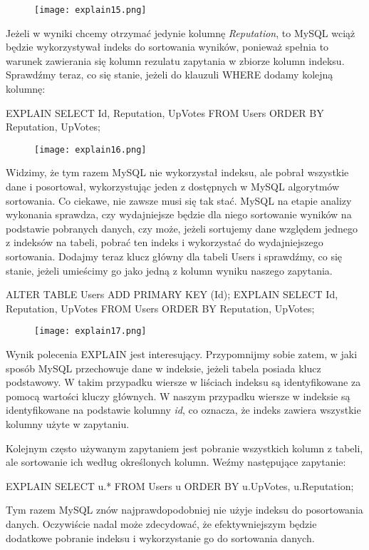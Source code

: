 \begin{figure}[H]
	\texttt{[image: explain15.png]} 
\end{figure}
Jeżeli w wyniki chcemy otrzymać jedynie kolumnę \textit{Reputation}, to MySQL wciąż będzie wykorzystywał indeks do sortowania wyników, ponieważ spełnia to warunek zawierania się kolumn rezulatu zapytania w zbiorze kolumn indeksu. Sprawdźmy teraz, co się stanie, jeżeli do klauzuli WHERE dodamy kolejną kolumnę:
\begin{spverbatim}
	EXPLAIN SELECT Id, Reputation, UpVotes FROM Users ORDER BY Reputation, UpVotes;
\end{spverbatim}
\begin{figure}[H]
	\texttt{[image: explain16.png]} 
\end{figure}
Widzimy, że tym razem MySQL nie wykorzystał indeksu, ale pobrał wszystkie dane i posortował, wykorzystując jeden z dostępnych w MySQL algorytmów sortowania. Co ciekawe, nie zawsze musi się tak stać. MySQL na etapie analizy wykonania sprawdza, czy wydajniejsze będzie dla niego sortowanie wyników na podstawie pobranych danych, czy może, jeżeli sortujemy dane względem jednego z indeksów na tabeli, pobrać ten indeks i wykorzystać do wydajniejszego sortowania. Dodajmy teraz klucz główny dla tabeli Users i sprawdźmy, co się stanie, jeżeli umieścimy go jako jedną z kolumn wyniku naszego zapytania.
\begin{spverbatim}
	ALTER TABLE Users ADD PRIMARY KEY (Id);
	EXPLAIN SELECT Id, Reputation, UpVotes FROM Users ORDER BY Reputation, UpVotes;
\end{spverbatim}

\begin{figure}[H]
	\texttt{[image: explain17.png]} 
\end{figure}
Wynik polecenia EXPLAIN jest interesujący. Przypomnijmy sobie zatem, w jaki sposób MySQL przechowuje dane w indeksie, jeżeli tabela posiada klucz podstawowy. W takim przypadku wiersze w liściach indeksu są identyfikowane za pomocą wartości kluczy głównych. W naszym przypadku wiersze w indeksie są identyfikowane na podstawie kolumny \textit{id}, co oznacza, że indeks zawiera wszystkie kolumny użyte w zapytaniu.

 Kolejnym często używanym zapytaniem jest pobranie wszystkich kolumn z tabeli, ale sortowanie ich według określonych kolumn. Weźmy następujące zapytanie:
\begin{spverbatim}
	EXPLAIN SELECT u.* FROM Users u ORDER BY u.UpVotes, u.Reputation;
\end{spverbatim}
Tym razem MySQL znów najprawdopodobniej nie użyje indeksu do posortowania danych. Oczywiście nadal może zdecydować, że efektywniejszym będzie dodatkowe pobranie indeksu i wykorzystanie go do sortowania danych.

